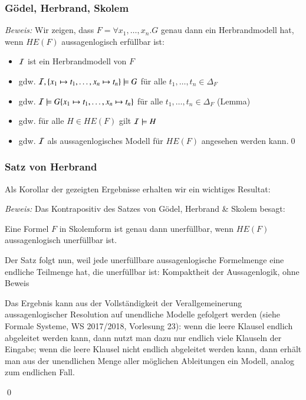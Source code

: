 \documentclass[aspectratio=1610,onlymath]{beamer}
\begin{document}
\begin{frame}\frametitle{Gödel, Herbrand, Skolem}

\pause

\emph{Beweis:} Wir zeigen, dass $F=\forall x_1,\ldots,x_n.G$ genau dann ein Herbrandmodell hat, wenn $HE(F)$ aussagenlogisch erfüllbar ist:\pause

\begin{itemize}
\item $\mathcal{I}$ ist ein Herbrandmodell von $F$\pause
\item gdw. $\mathcal{I},\{x_1\mapsto t_1,\ldots,x_n\mapsto t_n\}\models G$ für alle $t_1,\ldots,t_n\in\Delta_F$\pause
\item gdw. $\mathcal{I}\models G\{x_1\mapsto t_1,\ldots,x_n\mapsto t_n\}$ für alle $t_1,\ldots,t_n\in\Delta_F$ (Lemma)\pause
\item gdw. für alle $H\in HE(F)$ gilt $\mathcal{I}\models H$\pause
\item gdw. $\mathcal{I}$ als aussagenlogisches Modell für $HE(F)$ angesehen werden kann.\qed
\end{itemize}

\end{frame}

\begin{frame}\frametitle{Satz von Herbrand}

Als Korollar der gezeigten Ergebnisse erhalten wir ein wichtiges Resultat:


\pause\emph{Beweis:} Das Kontrapositiv des Satzes von Gödel, Herbrand \& Skolem besagt:\medskip

Eine Formel $F$ in Skolemform ist genau dann unerfüllbar, wenn $HE(F)$ aussagenlogisch unerfüllbar ist.\bigskip

Der Satz folgt nun, weil jede unerfüllbare aussagenlogische Formelmenge eine endliche
Teilmenge hat, die unerfüllbar ist: \alert{Kompaktheit der Aussagenlogik}, ohne Beweis\\[1ex]
{\tiny
\textcolor{devilscss}{Das Ergebnis kann aus der Vollständigkeit der Verallgemeinerung aussagenlogischer Resolution auf unendliche Modelle gefolgert werden (siehe Formale Systeme, WS 2017/2018, Vorlesung 23): wenn die leere Klausel endlich abgeleitet werden kann, dann nutzt man dazu nur endlich viele Klauseln der Eingabe; wenn die leere Klausel nicht endlich abgeleitet werden kann, dann erhält man aus der unendlichen Menge aller möglichen Ableitungen ein Modell, analog zum endlichen Fall.}

}\qed

\end{frame}
\end{document}
